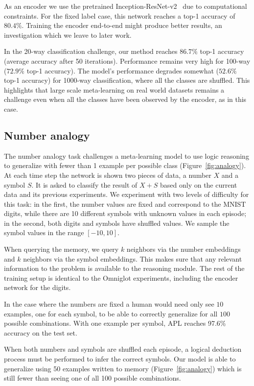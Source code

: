 \documentclass{article} \usepackage{iclr2019_conference,times}
\begin{document}
As an encoder we use the pretrained Inception-ResNet-v2~\citep{szegedy2017inception} due to computational constraints. For the fixed label case, this network reaches a top-1 accuracy of $80.4\%$. Training the encoder end-to-end might produce better results, an investigation which we leave to later work.

In the 20-way classification challenge, our method reaches $86.7\%$ top-1 accuracy (average accuracy after 50 iterations). Performance remains very high for 100-way ($72.9\%$ top-1 accuracy). The model's performance degrades somewhat ($52.6\%$ top-1 accuracy) for 1000-way classification, where all the classes are shuffled. This highlights that large scale meta-learning on real world datasets remains a challenge even when all the classes have been observed by the encoder, as in this case.

\subsection{Number analogy}



The number analogy task challenges a meta-learning model to use logic reasoning to generalize with fewer than 1 example per possible class (Figure~\ref{fig:analogy}). At each time step the network is shown two pieces of data, a number $X$ and a symbol $S$. It is asked to classify the result of $X+S$ based only on the current data and its previous experiments. 
We experiment with two levels of difficulty for this task: in the first, the number values are fixed and correspond to the MNIST digits, while there are 10 different symbols with unknown values in each episode; in the second, both digits and symbols have shuffled values. We sample the symbol values in the range $[-10, 10]$.

When querying the memory, we query $k$ neighbors via the number embeddings and $k$ neighbors via the symbol embeddings. This makes sure that any relevant information to the problem is available to the reasoning module. The rest of the training setup is identical to the Omniglot experiments, including the encoder network for the digits.

In the case where the numbers are fixed a human would need only see $10$ examples, one for each symbol, to be able to correctly generalize for all $100$ possible combinations. With one example per symbol, APL reaches 97.6\% accuracy on the test set.

 
When both numbers and symbols are shuffled each episode, a logical deduction process must be performed to infer the correct symbols. Our model is able to generalize using 50 examples written to memory (Figure~\ref{fig:analogy}) which is still fewer than seeing one of all 100 possible combinations.
\end{document}
